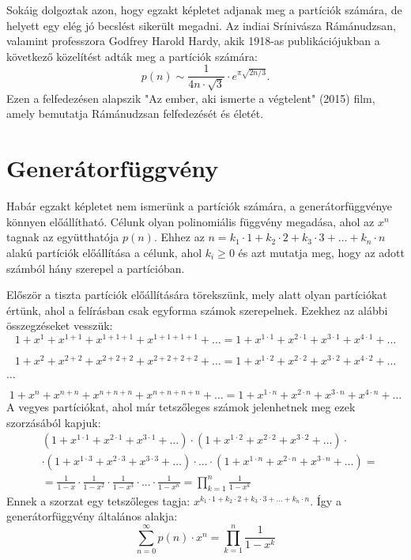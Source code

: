 Sokáig dolgoztak azon, hogy egzakt képletet adjanak meg a partíciók
számára, de helyett egy elég jó becslést sikerült megadni. Az indiai
Srínivásza Rámánudzsan, valamint professzora Godfrey Harold Hardy,
akik 1918-as publikációjukban a következő közelítést adták meg a partíciók
számára: 
\[
p(n)\sim\frac{1}{4n\cdot\sqrt{3}}\cdot e^{\pi\sqrt{2n/3}}.
\]
Ezen a felfedezésen alapszik "Az ember, aki ismerte a végtelent"
(2015) film, amely bemutatja Rámánudzsan felfedezését és életét.

\section*{Generátorfüggvény}

Habár egzakt képletet nem ismerünk a partíciók számára, a generátorfüggvénye
könnyen előállítható. Célunk olyan polinomiális függvény megadása,
ahol az $x^{n}$ tagnak az együtthatója $p(n)$. Ehhez az $n=k_{1}\cdot1+k_{2}\cdot2+k_{3}\cdot3+\dots+k_{n}\cdot n$
alakú partíciók előállítása a célunk, ahol $k_{i}\geq0$ és azt mutatja
meg, hogy az adott számból hány szerepel a partícióban.

Először a tiszta partíciók előállítására törekszünk, mely alatt olyan
partíciókat értünk, ahol a felírásban csak egyforma számok szerepelnek.
Ezekhez az alábbi összegzéseket vesszük: 
\[
1+x^{1}+x^{1+1}+x^{1+1+1}+x^{1+1+1+1}+\dots=1+x^{1\cdot1}+x^{2\cdot1}+x^{3\cdot1}+x^{4\cdot1}+\dots
\]

\[
1+x^{2}+x^{2+2}+x^{2+2+2}+x^{2+2+2+2}+\dots=1+x^{1\cdot2}+x^{2\cdot2}+x^{3\cdot2}+x^{4\cdot2}+\dots
\]


\begin{center}
$\dots$ 
\par\end{center}

\[
1+x^{n}+x^{n+n}+x^{n+n+n}+x^{n+n+n+n}+\dots=1+x^{1\cdot n}+x^{2\cdot n}+x^{3\cdot n}+x^{4\cdot n}+\dots
\]
A vegyes partíciókat, ahol már tetszőleges számok jelenhetnek meg
ezek szorzásából kapjuk: 
\begin{align*}
 & (1+x^{1\cdot1}+x^{2\cdot1}+x^{3\cdot1}+\dots)\cdot(1+x^{1\cdot2}+x^{2\cdot2}+x^{3\cdot2}+\dots)\cdot\\
 & \cdot(1+x^{1\cdot3}+x^{2\cdot3}+x^{3\cdot3}+\dots)\cdot...\cdot(1+x^{1\cdot n}+x^{2\cdot n}+x^{3\cdot n}+\dots)=\\
 & =\frac{1}{1-x}\cdot\frac{1}{1-x^{2}}\cdot\frac{1}{1-x^{3}}\cdot...\cdot\frac{1}{1-x^{n}}=\prod\limits_{k=1}^{n}\frac{1}{1-x^{k}}
\end{align*}
Ennek a szorzat egy tetszőleges tagja: $x^{k_{1}\cdot1+k_{2}\cdot2+k_{3}\cdot3+...+k_{n}\cdot n}.$
Így a generátorfüggvény általános alakja: 
\[
\boxed{\sum\limits_{n=0}^{\infty}p(n)\cdot x^{n}=\prod\limits_{k=1}^{n}\frac{1}{1-x^{k}}}
\]


